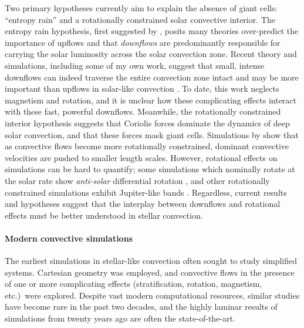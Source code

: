 \documentclass[11pt, preprint]{aastex}
\begin{document}
Two primary hypotheses currently aim to explain the absence of giant cells: ``entropy rain'' and a rotationally constrained solar convective interior.
The entropy rain hypothesis, first suggested by \citet{spruit1997}, posits many theories over-predict the importance of upflows and that \emph{downflows} are predominantly responsible for carrying the solar luminosity across the solar convection zone.
Recent theory and simulations, including some of my own work, suggest that small, intense downflows can indeed traverse the entire convection zone intact and may be more important than upflows in solar-like convection \citep{brandenburg2016, kapyla&all2017, andersLB2019}.
To date, this work neglects magnetism and rotation, and it is unclear how these complicating effects interact with these fast, powerful downflows.
Meanwhile, the rotationally constrained interior hypothesis suggests that Coriolis forces dominate the dynamics of deep solar convection, and that these forces mask giant cells.
Simulations by \citet{featherstone&hindman2016} show that as convective flows become more rotationally constrained, dominant convective velocities are pushed to smaller length scales.
However, rotational effects on simulations can be hard to quantify; some simulations which nominally rotate at the solar rate show \emph{anti-solar} differential rotation \citep{gastine&all2014}, and other rotationally constrained simulations exhibit Jupiter-like bands \citep{brun&all2017}.
Regardless, current results and hypotheses suggest that the interplay between downflows and rotational effects must be better understood in stellar convection.

\vspace{-0.5cm}
\paragraph{Modern convective simulations}
\label{sct:modern_simulations}
The earliest simulations in stellar-like convection \citep{graham1975, hurlburt&all1984, cattaneo&all1991, brummell&all1996, brummell&all1998} often sought to study simplified systems.
Cartesian geometry was employed, and convective flows in the presence of one or more complicating effects (stratification, rotation, magnetism, etc.)~were explored.
Despite vast modern computational resources, similar studies \citep[e.g.,][]{wood&brummell2012, anders&brown2017, wood&brummell2018} have become rare in the past two decades, and the highly laminar results of simulations from twenty years ago are often the state-of-the-art.
\end{document}
